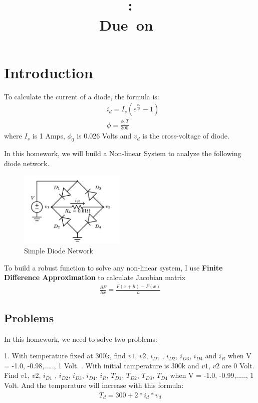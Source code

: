 \documentclass{article}
\title{
    \vspace{2in}
    \textmd{\textbf{\hmwkClass}}\\
    \textmd{\textbf{\hmwkID: \hmwkTitle}} \\
    \normalsize\vspace{0.1in}\small{Due\ on\ \hmwkDueDate}\\
    \vspace{3in}
}
\author{\textbf{\hmwkAuthorName}}
\date{} %
\begin{document}
\maketitle
\newpage

\section{Introduction}
To calculate the current of a diode, the formula is:
\begin{align}
    & i_d = I_s(e^{\frac{v_d}{\phi}} - 1) \\
    & \phi = \frac{\phi_0T}{300}
\end{align}
where $I_s$ is 1 Amps, $\phi_0$ is 0.026 Volts and $v_d$ is the cross-voltage of diode.

In this homework, we will build a Non-linear System to analyze the following diode network.
\begin{figure}[H]
    \centering
    \includegraphics[width=0.45\textwidth]{src/diode-network.jpg}
    \caption{Simple Diode Network}
    \label{fig:diode-network}
\end{figure}
To build a robust function to solve any non-linear system, I use \textbf{Finite Difference Approximation} to calculate Jacobian matrix
\begin{align}
    \frac{\partial{F}}{\partial{x}} = \frac{F(x+h) - F(x)}{h}
\end{align}

\subsection{Problems}
In this homework, we need to solve two problems: \newline

1. With temperature fixed at 300k, find $v1$, $v2$, $i_{D1}$ , $i_{D2}$, $i_{D3}$, $i_{D4}$ and $i_R$ when V = -1.0, -0.98,....., 1 Volt. \newline
{}. With initial tamperature is 300k and $v1$, $v2$ are 0 Volt. Find $v1$, $v2$, $i_{D1}$ , $i_{D2}$, $i_{D3}$, $i_{D4}$, $i_R$, $T_{D1}$,
$T_{D2}$, $T_{D3}$, $T_{D4}$ when V = -1.0, -0.99,....., 1 Volt. And the temperature will increase with this formula:
\begin{align}
    T_d = 300 + 2 * i_d * v_d
\end{align}
\end{document}
